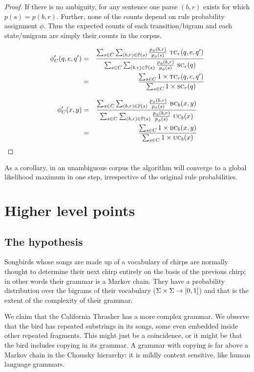 \documentclass[12pt]{article}
\theoremstyle{definition}
\begin{document}
\begin{proof}
  If there is no ambiguity, for any sentence one parse $(b,r)$ exists for which $p(s)=p(b,r)$. Further, none of the counts depend on rule probability assignment $\phi$. Thus the expected counts of each transition/bigram and each state/unigram are simply their counts in the corpus.

  \begin{eqnarray*}
    \phi_C'(q,e,q')& = &\frac{\sum_{s\in C}\sum_{(b,r)\in\mathbb{P}(s)} \frac{p_\phi(b,r)}{p_\phi(s)}~ \text{\textsc{tc}}_r(q,e,q')}{\sum_{s\in C}\sum_{(b,r)\in\mathbb{P}(s)} \frac{p_\phi(b,r)}{p_\phi(s)}~ \text{\textsc{sc}}_r(q)}\\
    & = &\frac{\sum_{s\in C} 1 \times \text{\textsc{tc}}_r(q,e,q')}{\sum_{s\in C} 1 \times \text{\textsc{sc}}_r(q)}
  \end{eqnarray*}

  \begin{eqnarray*}
    \phi_C'(x,y)& = &\frac{\sum_{s\in C}\sum_{(b,r)\in\mathbb{P}(s)} \frac{p_\phi(b,r)}{p_\phi(s)}~ \text{\textsc{bc}}_b(x,y)}{\sum_{s\in C}\sum_{(b,r)\in\mathbb{P}(s)} \frac{p_\phi(b,r)}{p_\phi(s)}~ \text{\textsc{uc}}_b(x)}\\
    & = &\frac{\sum_{s\in C} 1 \times \text{\textsc{bc}}_b(x,y)}{\sum_{s\in C} 1 \times \text{\textsc{uc}}_b(x)}
  \end{eqnarray*}


\end{proof}

As a corollary, in an unambiguous corpus the algorithm will converge to a global likelihood maximum in one step, irrespective of the original rule probabilities.



\section{Higher level points}
\label{sec:higher-level-points}

\subsection{The hypothesis}
\label{sec:hypothesis}


Songbirds whose songs are made up of a vocabulary of chirps are normally thought to determine their next chirp entirely on the basis of the previous chirp; in other words their grammar is a Markov chain. They have a probability distribution over the bigrams of their vocabulary ($\Sigma \times \Sigma \rightarrow [0,1]$) and that is the extent of the complexity of their grammar.

We claim that the California Thrasher has a more complex grammar. We observe that the bird has repeated substrings in its songs, some even embedded inside other repeated fragments. This might just be a coincidence, or it might be that the bird includes copying in its grammar.  A grammar with copying is far above a Markov chain in the Chomsky hierarchy: it is mildly context sensitive, like human language grammars. 
\end{document}

